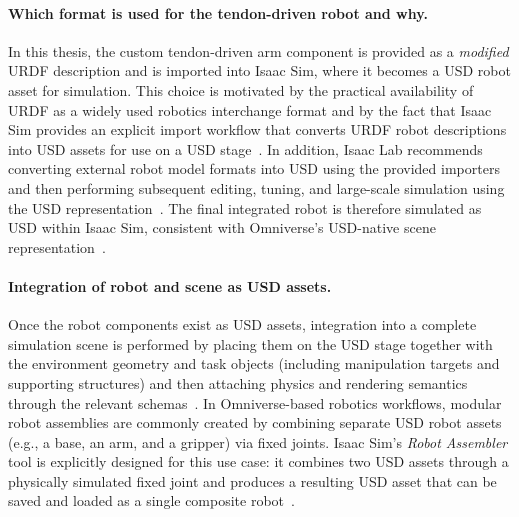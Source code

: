 \paragraph{Which format is used for the tendon-driven robot and why.}
In this thesis, the custom tendon-driven arm component is provided as a \emph{modified} \ac{URDF} description and is imported into Isaac Sim, where it becomes a \ac{USD} robot asset for simulation. This choice is motivated by the practical availability of \ac{URDF} as a widely used robotics interchange format and by the fact that Isaac Sim provides an explicit import workflow that converts \ac{URDF} robot descriptions into \ac{USD} assets for use on a \ac{USD} stage~\cite{isaacsim_import_urdf_510}. In addition, Isaac Lab recommends converting external robot model formats into \ac{USD} using the provided importers and then performing subsequent editing, tuning, and large-scale simulation using the \ac{USD} representation~\cite{isaaclab_import_new_asset}. The final integrated robot is therefore simulated as \ac{USD} within Isaac Sim, consistent with Omniverse’s \ac{USD}-native scene representation~\cite{isaaclab_import_new_asset}. %

\paragraph{Integration of robot and scene as USD assets.}
Once the robot components exist as \ac{USD} assets, integration into a complete simulation scene is performed by placing them on the \ac{USD} stage together with the environment geometry and task objects (including manipulation targets and supporting structures) and then attaching physics and rendering semantics through the relevant schemas~\cite{openusd_usdphysics_schema,openusd_usdlux_schema}. In Omniverse-based robotics workflows, modular robot assemblies are commonly created by combining separate \ac{USD} robot assets (e.g., a base, an arm, and a gripper) via fixed joints. Isaac Sim’s \emph{Robot Assembler} tool is explicitly designed for this use case: it combines two \ac{USD} assets through a physically simulated fixed joint and produces a resulting \ac{USD} asset that can be saved and loaded as a single composite robot~\cite{isaacsim_robot_assembler_510}. %

